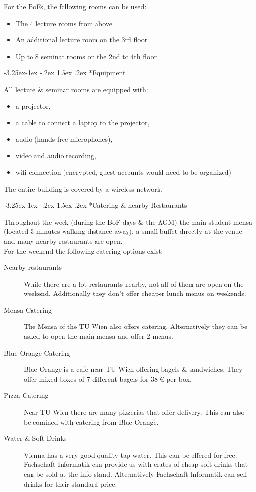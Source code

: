 \documentclass[10pt,a4paper]{article}
\makeatletter
\renewcommand\subsubsection{%
\@startsection{subsubsection}{2}{\z@}%
              {-3.25ex\@plus -1ex \@minus -.2ex}%
              {1.5ex \@plus .2ex}%
              {\color{kdedarker}\sffamily\large\bfseries}}
\makeatother
\begin{document}
For the BoFs, the following rooms can be used:\\
\begin{itemize}
	\item The 4 lecture rooms from above
	\item An additional lecture room on the 3rd floor
	\item Up to 8 seminar rooms on the 2nd to 4th floor
\end{itemize}

\subsubsection*{Equipment}
All lecture \& seminar rooms are equipped with:
\begin{itemize}
	\item a projector,
	\item a cable to connect a laptop to the projector,
	\item audio (hands-free microphones),
	\item video and audio recording,
	\item wifi connection (encrypted, guest accounts would need to be organized)
\end{itemize}

The entire building is covered by a wireless network.

\subsubsection*{Catering \& nearby Restaurants}
Throughout the week (during the BoF days \& the AGM) the main student mensa (located 5 minutes walking distance away), a small buffet directly at the venue and many nearby restaurants are open.\\
For the weekend the following catering options exist:
\begin{description}
\item[\color{kdedarker} Nearby restaurants] While there are a lot restaurants nearby, not all of them are open on the weekend. Additionally they don't offer cheaper lunch menus on weekends.
\item[\color{kdedarker} Mensa Catering] The Mensa of the TU Wien also offers catering. Alternatively they can be asked to open the main mensa and offer 2 menus.
\item[\color{kdedarker} Blue Orange Catering] Blue Orange is a cafe near TU Wien offering bagels \& sandwiches. They offer mixed boxes of 7 different bagels for 38 \euro{} per box.
\item[\color{kdedarker} Pizza Catering] Near TU Wien there are many pizzerias that offer delivery. This can also be comined with catering from Blue Orange.
\item[\color{kdedarker} Water \& Soft Drinks] Vienna has a very good quality tap water. This can be offered for free. Fachschaft Informatik can provide us with crates of cheap soft-drinks that can be sold at the info-stand. Alternatively Fachschaft Informatik can sell drinks for their standard price.
\end{description}
\end{document}
